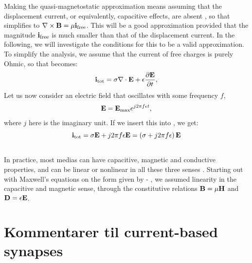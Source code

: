 Making the quasi-magnetostatic approximation means assuming that the displacement current, or equivalently, capacitive effects, are absent , so that  simplifies to ${\bf \nabla} \times {\bf B}  =  \mu{\bf i}_\text{free}$. This will be a good approximation provided that the magnitude ${\bf i}_\text{free}$ is much smaller  than that of the displacement current. In the following, we will investigate the conditions for this to be a valid approximation. To simplify the analysis, we assume that the current of free charges is purely Ohmic, so that  becomes:
\begin{equation}
{\bf i}_\text{tot} = \sigma {\bf \nabla} \cdot {\bf E} + \epsilon\frac{\partial {\bf E}}{\partial t},
\label{eq:Basics:totcurrent2}
\end{equation}
Let us now consider an electric field that oscillates with some frequency $f$,
\begin{equation}
{\bf E} = {\bf E}_\text{max} e^{j2\pi f \epsilon t},
\label{eq:Basics:Ecomponent}
\end{equation}
where $j$ here is the imaginary unit. 
If we insert this into , we get:
\begin{equation}
{\bf i}_\text{tot} = \sigma{\bf E} +  j 2 \pi f \epsilon {\bf E} = \left( \sigma + j 2 \pi f \epsilon \right){\bf E}
\label{eq:Basics:totcurrent3}
\end{equation}

\subsection{ }
\label{sec:Basics:LinEx}
In practice, most medias can  have capacitive, magnetic and conductive properties, and can be linear or nonlinear in all these three senses . Starting out with Maxwell's equations on the form given by - , we assumed linearity in the capacitive and magnetic sense, through the constitutive relations ${\bf B} = \mu{\bf H}$ and ${\bf D} = \epsilon {\bf E}$.

\section{Kommentarer til current-based synapses}


